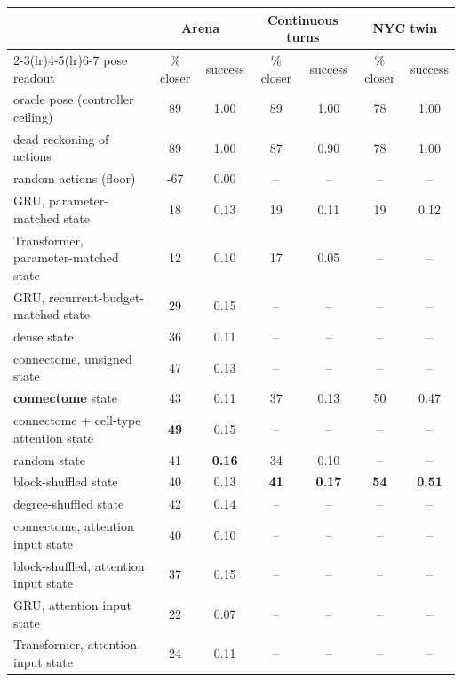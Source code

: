 \begin{tabular}{lcccccc}
    \toprule
    & \multicolumn{2}{c}{Arena} & \multicolumn{2}{c}{Continuous turns} & \multicolumn{2}{c}{NYC twin} \\
    \cmidrule(lr){2-3}\cmidrule(lr){4-5}\cmidrule(lr){6-7}
    pose readout & \% closer & success & \% closer & success & \% closer & success \\
    \midrule
    oracle pose (controller ceiling) & 89 & 1.00 & 89 & 1.00 & 78 & 1.00 \\
    dead reckoning of actions & 89 & 1.00 & 87 & 0.90 & 78 & 1.00 \\
    random actions (floor) & -67 & 0.00 & -- & -- & -- & -- \\
    \midrule
    GRU, parameter-matched state & 18 & 0.13 & 19 & 0.11 & 19 & 0.12 \\
    Transformer, parameter-matched state & 12 & 0.10 & 17 & 0.05 & -- & -- \\
    GRU, recurrent-budget-matched state & 29 & 0.15 & -- & -- & -- & -- \\
    dense state & 36 & 0.11 & -- & -- & -- & -- \\
    connectome, unsigned state & 47 & 0.13 & -- & -- & -- & -- \\
    \textbf{connectome} state & 43 & 0.11 & 37 & 0.13 & 50 & 0.47 \\
    connectome + cell-type attention state & \textbf{49} & 0.15 & -- & -- & -- & -- \\
    random state & 41 & \textbf{0.16} & 34 & 0.10 & -- & -- \\
    block-shuffled state & 40 & 0.13 & \textbf{41} & \textbf{0.17} & \textbf{54} & \textbf{0.51} \\
    degree-shuffled state & 42 & 0.14 & -- & -- & -- & -- \\
    connectome, attention input state & 40 & 0.10 & -- & -- & -- & -- \\
    block-shuffled, attention input state & 37 & 0.15 & -- & -- & -- & -- \\
    GRU, attention input state & 22 & 0.07 & -- & -- & -- & -- \\
    Transformer, attention input state & 24 & 0.11 & -- & -- & -- & -- \\
    \bottomrule
\end{tabular}

